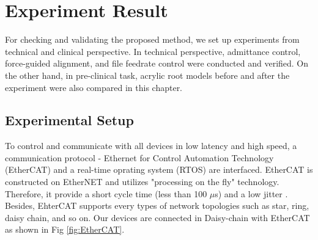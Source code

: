 \chapter{Experiment Result}
\hspace*{6mm}For checking and validating the proposed method, we set up experiments from technical and clinical perspective. In technical perspective, admittance control, force-guided alignment, and file feedrate control were conducted and verified. On the other hand, in pre-clinical task, acrylic root models before and after the experiment were also compared in this chapter. 
\section{Experimental Setup}
\hspace*{6mm}To control and communicate with all devices in low latency and high speed, a communication protocol - Ethernet for Control Automation Technology (EtherCAT) and a real-time oprating system (RTOS) are interfaced. EtherCAT is constructed on EtherNET and utilizes "processing on the fly" technology. Therefore, it provide a short cycle time (less than 100 $\mu$s) and a low jitter \cite{web5}. Besides, EhterCAT supports every types of network topologies such as star, ring, daisy chain, and so on.	 Our devices are connected in Daisy-chain with EtherCAT as shown in Fig \ref{fig:EtherCAT}.


